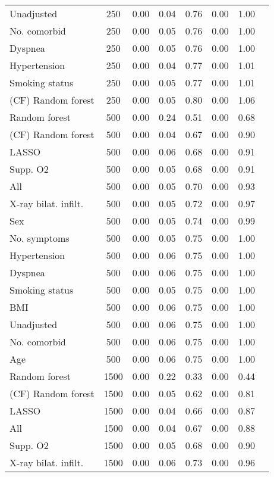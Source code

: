 \documentclass{article}
\begin{document}
{\begin{longtable}{lccccccc}
Unadjusted & 250 & 0.00 & 0.04 & 0.76 & 0.00 & 1.00 \\ 
No. comorbid & 250 & 0.00 & 0.05 & 0.76 & 0.00 & 1.00 \\ 
Dyspnea & 250 & 0.00 & 0.05 & 0.76 & 0.00 & 1.00 \\ 
Hypertension & 250 & 0.00 & 0.04 & 0.77 & 0.00 & 1.01 \\ 
Smoking status & 250 & 0.00 & 0.05 & 0.77 & 0.00 & 1.01 \\ 
(CF) Random forest & 250 & 0.00 & 0.05 & 0.80 & 0.00 & 1.06 \\ \midrule() 
Random forest & 500 & 0.00 & 0.24 & 0.51 & 0.00 & 0.68 \\ 
(CF) Random forest & 500 & 0.00 & 0.04 & 0.67 & 0.00 & 0.90 \\ 
LASSO & 500 & 0.00 & 0.06 & 0.68 & 0.00 & 0.91 \\ 
Supp. O2 & 500 & 0.00 & 0.05 & 0.68 & 0.00 & 0.91 \\ 
All & 500 & 0.00 & 0.05 & 0.70 & 0.00 & 0.93 \\ 
X-ray bilat. infilt. & 500 & 0.00 & 0.05 & 0.72 & 0.00 & 0.97 \\ 
Sex & 500 & 0.00 & 0.05 & 0.74 & 0.00 & 0.99 \\ 
No. symptoms & 500 & 0.00 & 0.05 & 0.75 & 0.00 & 1.00 \\ 
Hypertension & 500 & 0.00 & 0.06 & 0.75 & 0.00 & 1.00 \\ 
Dyspnea & 500 & 0.00 & 0.06 & 0.75 & 0.00 & 1.00 \\ 
Smoking status & 500 & 0.00 & 0.05 & 0.75 & 0.00 & 1.00 \\ 
BMI & 500 & 0.00 & 0.06 & 0.75 & 0.00 & 1.00 \\ 
Unadjusted & 500 & 0.00 & 0.06 & 0.75 & 0.00 & 1.00 \\ 
No. comorbid & 500 & 0.00 & 0.06 & 0.75 & 0.00 & 1.00 \\ 
Age & 500 & 0.00 & 0.06 & 0.75 & 0.00 & 1.00 \\ \midrule() 
Random forest & 1500 & 0.00 & 0.22 & 0.33 & 0.00 & 0.44 \\ 
(CF) Random forest & 1500 & 0.00 & 0.05 & 0.62 & 0.00 & 0.81 \\ 
LASSO & 1500 & 0.00 & 0.04 & 0.66 & 0.00 & 0.87 \\ 
All & 1500 & 0.00 & 0.04 & 0.67 & 0.00 & 0.88 \\ 
Supp. O2 & 1500 & 0.00 & 0.05 & 0.68 & 0.00 & 0.90 \\ 
X-ray bilat. infilt. & 1500 & 0.00 & 0.06 & 0.73 & 0.00 & 0.96 \\ 

\end{longtable}}
\end{document}
